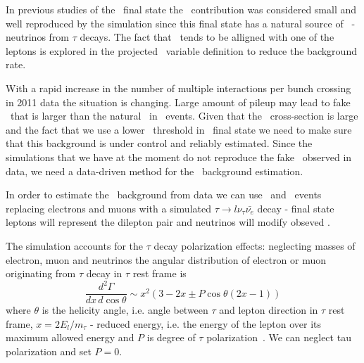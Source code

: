 In previous studies of the \WW\ final state the \dytt\ contribution
was considered small and well reproduced by the simulation since this
final state has a natural source of \met\ - neutrinos from $\tau$
decays. The fact that \met\ tends to be alligned with one of the
leptons is explored in the projected \met\ variable definition to
reduce the background rate.

With a rapid increase in the number of multiple interactions per bunch
crossing in 2011 data the situation is changing. Large amount of
pileup may lead to fake \met\ that is larger than the natural \met\
in \dytt\ events. Given that the \dytt\ cross-section is large and the
fact that we use a lower \met\ threshold in \emu\ final state we need
to make sure that this background is under control and reliably
estimated. Since the simulations that we have at the moment do not
reproduce the fake \met\ observed in data, we need a data-driven
method for the \dytt\ background estimation.

In order to estimate the \dytt\ background from data we can use \zee\
and \zmm\ events replacing electrons and muons with a simulated
$\tau\to l\nu_\tau\bar{\nu_e}$ decay - final state leptons will
represent the dilepton pair and neutrinos will modify obseved \met{}.

The simulation accounts for the $\tau$ decay polarization effects:
neglecting masses of electron, muon and neutrinos the angular
distribution of electron or muon originating from $\tau$ decay in
$\tau$ rest frame is
\begin{equation}
        \frac{d^2\Gamma}{dx\,d\cos\theta}\sim x^2(3-2x \pm P\cos\theta(2x-1))
\end{equation}
where $\theta$ is the helicity angle, i.e. angle between $\tau$ and
lepton direction in $\tau$ rest frame, $x=2E_l/m_\tau$ - reduced
energy, i.e. the energy of the lepton over its maximum allowed energy
and $P$ is degree of $\tau$ polarization~\cite{pdg}. We can neglect
tau polarization and set $P=0$.




